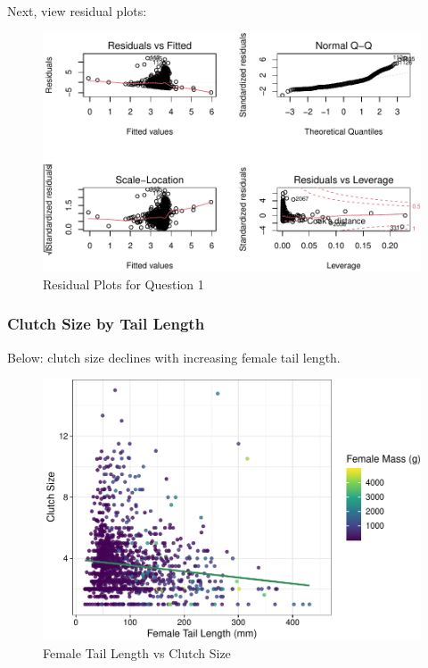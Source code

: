 \documentclass[
  12pt,
]{article}
\begin{document}
Next, view residual plots:

\begin{figure}
\centering
\includegraphics{Project_Code_files/figure-latex/q-1_residuals-1.pdf}
\caption{Residual Plots for Question 1}
\end{figure}

\newpage

\hypertarget{clutch-size-by-tail-length}{%
\subsubsection{Clutch Size by Tail
Length}\label{clutch-size-by-tail-length}}

Below: clutch size declines with increasing female tail length.

\begin{figure}
\centering
\includegraphics{Project_Code_files/figure-latex/q-1_plot_main-1.pdf}
\caption{Female Tail Length vs Clutch Size}
\end{figure}
\end{document}
